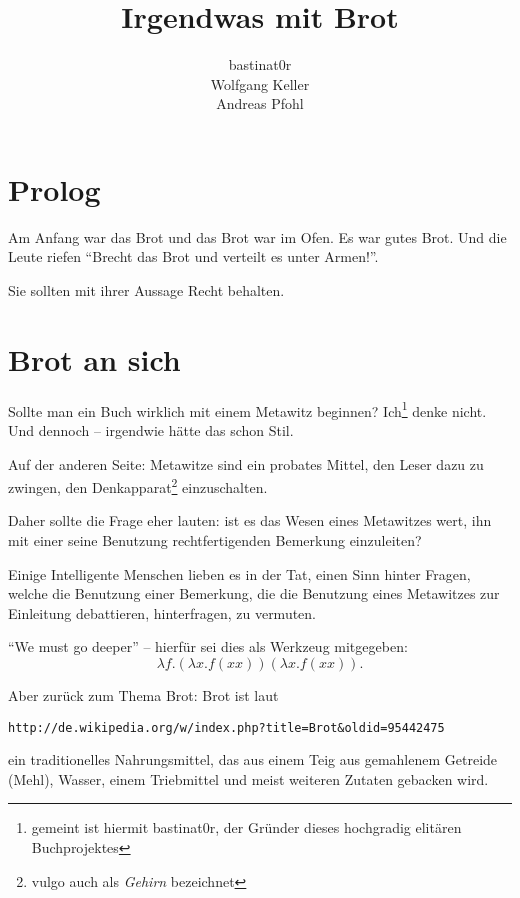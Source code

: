 \documentclass{scrbook}
\title{Irgendwas mit Brot}
\author{bastinat0r \\ Wolfgang Keller \\ Andreas Pfohl}
\begin{document}
\maketitle

\chapter*{Prolog}

Am Anfang war das Brot und das Brot war im Ofen. Es war gutes Brot. Und die Leute riefen "`Brecht das Brot und verteilt es unter Armen!"'.

Sie sollten mit ihrer Aussage Recht behalten.

\chapter{Brot an sich}

Sollte man ein Buch wirklich mit einem Metawitz beginnen? Ich\footnote{gemeint ist hiermit bastinat0r, der Gründer dieses hochgradig elitären Buchprojektes} denke nicht. Und dennoch – irgendwie hätte das schon Stil.

Auf der anderen Seite: Metawitze sind ein probates Mittel, den Leser dazu zu zwingen, den Denkapparat\footnote{vulgo auch als \emph{Gehirn} bezeichnet} einzuschalten.

Daher sollte die Frage eher lauten: ist es das Wesen eines Metawitzes wert, ihn mit einer seine Benutzung rechtfertigenden Bemerkung einzuleiten?

Einige Intelligente Menschen lieben es in der Tat, einen Sinn hinter Fragen, welche die Benutzung einer Bemerkung, die die Benutzung eines Metawitzes zur Einleitung debattieren, hinterfragen, zu vermuten.

"`We must go deeper"' -- hierfür sei dies als Werkzeug mitgegeben:
\begin{displaymath}
\lambda f.(\lambda x.f (x x)) (\lambda x.f (x x)).
\end{displaymath}
%

Aber zurück zum Thema Brot: Brot ist laut \begin{verbatim}http://de.wikipedia.org/w/index.php?title=Brot&oldid=95442475\end{verbatim} ein traditionelles Nahrungsmittel, das aus einem Teig aus gemahlenem Getreide (Mehl), Wasser, einem Triebmittel und meist weiteren Zutaten gebacken wird.
\end{document}
